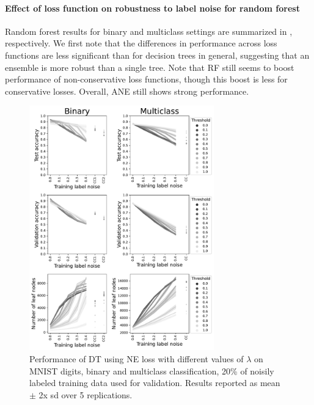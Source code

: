 \documentclass[letterpaper]{article} %
\begin{document}
\paragraph{Effect of loss function on robustness to label noise for random forest}
Random forest results for binary and multiclass settings are summarized in
, respectively.
We first note that the 
differences in performance across loss functions
are less significant than for
decision trees in general, suggesting that an ensemble is more robust than a
single tree.
Note that RF still seems to boost performance of non-conservative loss functions,
though this boost is less for conservative losses. 
Overall, ANE still shows strong performance. 

\begin{figure}[t]
    \centering
    \includegraphics[width=8cm]{figs/threshold_tuning.pdf}
    \caption{Performance of DT using NE loss with different values of $\lambda$ on MNIST digits, binary and multiclass classification, 20\% of noisily labeled training data used for validation.
    Results reported as mean $\pm$ 2x sd over 5 replications.}
    \label{fig:threshold_tuning}
\end{figure}
\end{document}

